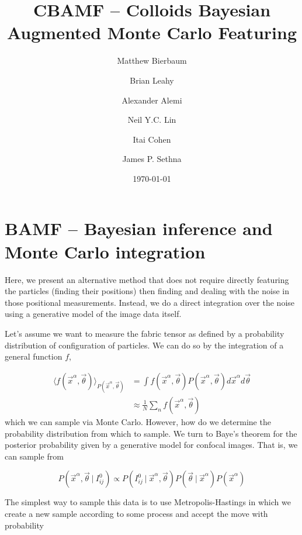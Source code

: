 \documentclass[preprint,amsmath,amssymb]{revtex4}
\newcommand\given[1][]{\:#1\vert\:}
\begin{document}
\title{CBAMF -- Colloids Bayesian Augmented Monte Carlo Featuring}
\author{Matthew Bierbaum}
\author{Brian Leahy}
\author{Alexander Alemi}
\author{Neil Y.C. Lin}
\author{Itai Cohen}
\author{James P. Sethna}

\date{\today}

\maketitle

\section{BAMF -- Bayesian inference and Monte Carlo integration}

Here, we present an alternative method that does not require directly
featuring the particles (finding their positions) then finding and dealing
with the noise in those positional measurements.  Instead, we do a direct
integration over the noise using a generative model of the image data itself.

Let's assume we want to measure the fabric tensor as defined by a probability
distribution of configuration of particles. We can do so by the integration
of a general function $f$,

\begin{align*}
    \langle f(\vec{x}^{\alpha}, \vec{\theta})\rangle_{P(\vec{x}^{\alpha},\vec{\theta})} &= \int f(\vec{x}^{\alpha}, \vec{\theta}) P(\vec{x}^\alpha,\vec{\theta}) d\vec{x}^\alpha d\vec{\theta} \\
                                                                                        &\approx \frac{1}{N}\sum_{n} f(\vec{x}^\alpha, \vec{\theta})
\end{align*}
which we can sample via Monte Carlo.  However, how do we determine the
probability distribution from which to sample.  We turn to Baye's theorem for
the posterior probability given by a generative model for confocal images.
That is, we can sample from

\begin{equation}
    P(\vec{x}^\alpha, \vec{\theta} \given I^0_{ij}) \propto P(I^0_{ij} \given \vec{x}^\alpha, \vec{\theta}) P(\vec{\theta} \given \vec{x}^\alpha) P(\vec{x}^\alpha)
\end{equation}

The simplest way to sample this data is to use Metropolis-Hastings in which we
create a new sample according to some process and accept the move with
probability
\end{document}

